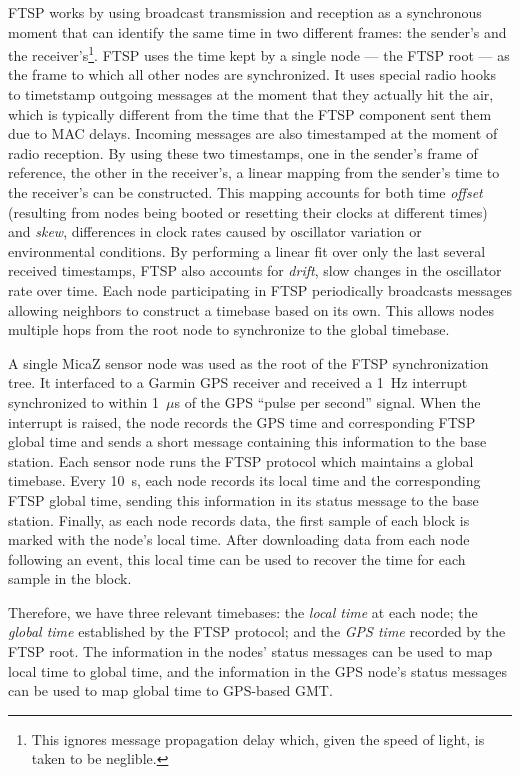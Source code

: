 FTSP works by using broadcast transmission and reception as a synchronous
moment that can identify the same time in two different frames: the sender's
and the receiver's\footnote{This ignores message propagation delay which,
given the speed of light, is taken to be neglible.}. FTSP uses the time kept
by a single node --- the FTSP root --- as the frame to which all other nodes
are synchronized. It uses special radio hooks to timetstamp outgoing messages
at the moment that they actually hit the air, which is typically different
from the time that the FTSP component sent them due to MAC delays. Incoming
messages are also timestamped at the moment of radio reception. By using
these two timestamps, one in the sender's frame of reference, the other in
the receiver's, a linear mapping from the sender's time to the receiver's can
be constructed. This mapping accounts for both time \textit{offset}
(resulting from nodes being booted or resetting their clocks at different
times) and \textit{skew}, differences in clock rates caused by oscillator
variation or environmental conditions. By performing a linear fit over only
the last several received timestamps, FTSP also accounts for \textit{drift},
slow changes in the oscillator rate over time. Each node participating in
FTSP periodically broadcasts messages allowing neighbors to construct a
timebase based on its own. This allows nodes multiple hops from the root node
to synchronize to the global timebase.

A single MicaZ sensor node was used as the root of the FTSP synchronization
tree. It interfaced to a Garmin GPS receiver and received a 1~Hz interrupt
synchronized to within 1~$\mu$s of the GPS ``pulse per second'' signal.
When the interrupt is raised, the node records the GPS time and corresponding
FTSP global time and sends a short message containing this information to the
base station. Each sensor node runs the FTSP protocol which maintains a
global timebase. Every 10~s, each node records its local time and the
corresponding FTSP global time, sending this information in its status
message to the base station. Finally, as each node records data, the first
sample of each block is marked with the node's local time. After downloading
data from each node following an event, this local time can be used to
recover the time for each sample in the block.

Therefore, we have three relevant timebases: the \textit{local time} at each
node; the \textit{global time} established by the FTSP protocol; and the
\textit{GPS time} recorded by the FTSP root. The information in the nodes'
status messages can be used to map local time to global time, and the
information in the GPS node's status messages can be used to map global time
to GPS-based GMT.

